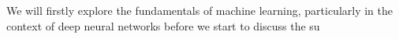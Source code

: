 We will firstly explore the fundamentals of machine learning, particularly in the context of deep neural networks before we start to discuss the su